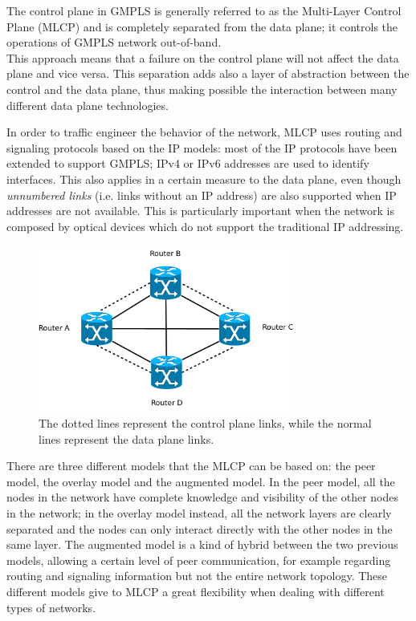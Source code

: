 \documentclass[10pt,a4paper]{report}
\begin{document}
The control plane in GMPLS is generally referred to as the Multi-Layer
Control Plane (MLCP) and is completely separated from the data plane;
it controls the operations of GMPLS network out-of-band. \\
This approach means that a failure on the control plane will not
affect the data plane and vice versa. This separation adds also a
layer of abstraction between the control and the data plane, thus
making possible the interaction between many different data plane
technologies.

In order to traffic engineer the behavior of the network, MLCP uses
routing and signaling protocols based on the IP models: most of the IP
protocols have been extended to support GMPLS; IPv4 or IPv6 addresses
are used to identify interfaces. This also applies in a certain
measure to the data plane, even though \textit{unnumbered links}
(i.e. links without an IP address) are also supported when IP
addresses are not available. This is particularly important when the
network is composed by optical devices which do not support the
traditional IP addressing.

\begin{figure}[!htbp]
  \centering
  \includegraphics[width=0.75\textwidth]{img/gmpls_mlcp}
  \caption[MPLS network]{The dotted lines represent  the control plane
    links, while the normal lines represent the data plane links.}
  \label{fig:gmpls_mlcp}
\end{figure}

There are three different models that the MLCP can be based on: the
peer model, the overlay model and the augmented model. In the peer
model, all the nodes in the network have complete knowledge and
visibility of the other nodes in the network; in the overlay model
instead, all the network layers are clearly separated and the nodes
can only interact directly with the other nodes in the same layer. The
augmented model is a kind of hybrid between the two previous models,
allowing a certain level of peer communication, for example regarding
routing and signaling information but not the entire network
topology. These different models give to MLCP a great flexibility when
dealing with different types of networks.
\end{document}
